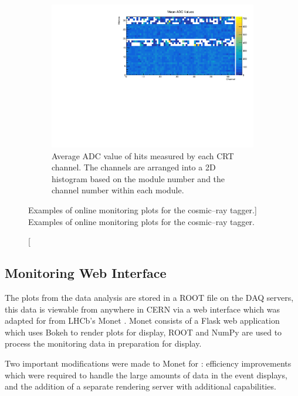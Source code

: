 \begin{figure}
	\begin{subfigure}[b]{0.8\textwidth}
		\centering
		\vspace{3mm}
		\includegraphics[width=\textwidth]{figures/crt_adc_om.pdf}
		\caption {Average ADC value of hits measured by each CRT channel. The 
		channels are arranged into a 2D histogram based on the module number and the 
		channel number within each module.}
		\label{fig:crt_adc_om}
	\end{subfigure}

	\caption
	[Examples of online monitoring plots for the cosmic--ray tagger.]
	{Examples of online monitoring plots for the cosmic--ray tagger.}
	\label{fig:crt_OM}

\end{figure}

\subsection{Monitoring Web Interface}
The plots from the data analysis are stored in a ROOT file on the \protodune{}
DAQ servers, this data is viewable from anywhere in CERN via a web interface
which was adapted for \protodune{} from LHCb's Monet \cite{Adinolfi_2017}. 
Monet consists of a Flask web application \cite{flask} which uses Bokeh
\cite{bokeh} to render plots for display, ROOT \cite{ANTCHEVA20092499} and 
NumPy \cite{numpy} are used to process the monitoring data in preparation for 
display.

Two important modifications were made to Monet for \protodune{}: efficiency 
improvements which were required to handle the large amounts of data in the 
event displays, and the addition of a separate rendering server with 
additional capabilities. 

